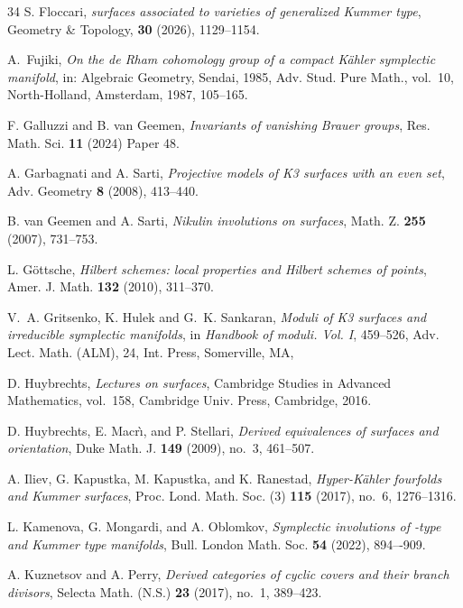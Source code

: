 \documentclass{amsart}
\makeatletter
\theoremstyle{definition}
\numberwithin{equation}{section}
\numberwithin{equation}{section} \theoremstyle{definition}
\newcounter{mathrecordid}
\newcommand{\mathboxbegin}[1]{%
  \stepcounter{mathrecordid}%
  \immediate\write\mathrecords{\themathrecordid,#1}%
  \special{pdf:bann << /Type /Annot /Subtype /Link /Border [0 0 0]
    /MathBoxID \themathrecordid /F 2
    /A << /S /URI /URI (urn:mathbox:\themathrecordid) >> >>}}
\newcommand{\mathboxinlineplain}[1]{$#1$}
\newcommand{\mathboxinline}[1]{%
  $\mathboxbegin{inline}#1\special{pdf:eann}$}
\newcommand{\recordmath}{%
  \ifmeasuring@\expandafter\mathboxinlineplain
  \else\expandafter\mathboxinline\fi}
\makeatother
\begin{document}
\begin{thebibliography}{34}
 S. Floccari,
  \emph{\recordmath{K3} surfaces associated to varieties of generalized Kummer type},
  Geometry \& Topology, {\bf 30} (2026), 1129--1154.  

A.~Fujiki, \emph{On the de {R}ham cohomology group of a compact {K}\"ahler
symplectic manifold}, in: Algebraic Geometry, {S}endai, 1985,
Adv. Stud. Pure Math., vol.~10, North-Holland, Amsterdam, 1987, 105--165.
  

 F. Galluzzi and B. van Geemen,
  \emph{Invariants of vanishing Brauer groups}, Res. Math. Sci. {\bf 11} (2024) Paper 48.

 A. Garbagnati and A. Sarti, \emph{Projective models of K3 surfaces with an even set}, Adv. Geometry {\bf 8} (2008), 413--440.

 B. van Geemen and A. Sarti,
  \emph{Nikulin involutions on \recordmath{K3} surfaces}, Math. Z. {\bf 255} (2007),
  731--753.

 L. G\"ottsche,
  \emph{Hilbert schemes: local properties and Hilbert schemes of points},
  Amer. J. Math. {\bf 132} (2010), 311--370.

 V.~A. Gritsenko, K. Hulek and G.~K. Sankaran, \emph{Moduli of K3 surfaces and irreducible symplectic manifolds}, in {\it Handbook of moduli. Vol. I}, 459--526, Adv. Lect. Math. (ALM), 24, Int. Press, Somerville, MA,


 D. Huybrechts,
  \emph{Lectures on \recordmath{K3} surfaces}, Cambridge Studies in Advanced Mathematics,
  vol.~158, Cambridge Univ. Press, Cambridge, 2016.

 D. Huybrechts, E. Macr\`\i, and P. Stellari,
  \emph{Derived equivalences of \recordmath{K3} surfaces and orientation},
  Duke Math. J. {\bf 149} (2009), no.~3, 461--507. %


 A. Iliev, G. Kapustka, M. Kapustka, and K. Ranestad,
  \emph{Hyper-K\"ahler fourfolds and Kummer surfaces},
  Proc. Lond. Math. Soc. (3) {\bf 115} (2017), no.~6, 1276--1316.

 L. Kamenova, G. Mongardi, and A. Oblomkov,
  \emph{Symplectic involutions of \recordmath{K3^{[n]}}-type and Kummer \recordmath{n} type
  manifolds}, Bull. London Math. Soc. {\bf 54} (2022), 894–-909.

 A. Kuznetsov and A. Perry,
  \emph{Derived categories of cyclic covers and their branch divisors},
  Selecta Math. (N.S.) {\bf 23} (2017), no.~1, 389--423.


\end{thebibliography}
\end{document}
